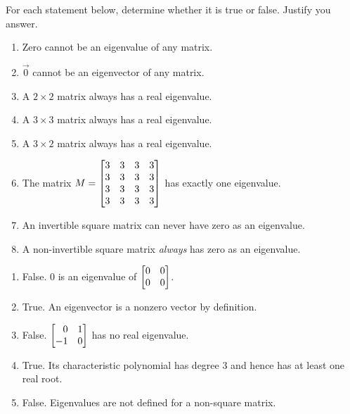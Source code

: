 \begin{exercises}
\begin{problist}
		\prob For each statement below, determine whether it is true or false. Justify
		you answer.
		\begin{enumerate}
			\item Zero cannot be an eigenvalue of any matrix.

			\item $\vec 0$ cannot be an eigenvector of any matrix.

			\item A $2\times 2$ matrix always has a real eigenvalue.

			\item A $3\times 3$ matrix always has a real eigenvalue.

			\item A $3\times 2$ matrix always has a real eigenvalue.

			\item The matrix $M = \mat{3&3&3&3\\3&3&3&3\\3&3&3&3\\3&3&3&3}$ has
				exactly one eigenvalue.

			\item An invertible square matrix can never have zero as an eigenvalue.
			
			\item A non-invertible square matrix \emph{always} has zero as an eigenvalue.
		\end{enumerate}


		\begin{solution}

			\begin{enumerate}
				\item False. $0$ is an eigenvalue of $\mat{0 & 0 \\ 0 & 0}$.

				\item True. An eigenvector is a nonzero vector by definition.

				\item False. $\mat{0 & 1 \\ -1 & 0}$ has no real eigenvalue.

				\item True. Its characteristic polynomial has degree $3$ and
					hence has at least one real root.

				\item False. Eigenvalues are not defined for a non-square matrix.


\end{enumerate}
\end{solution}
\end{problist}
\end{exercises}
